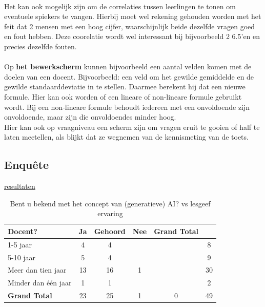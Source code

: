 \documentclass[12pt]{article}
\begin{document}
\begin{multicols}{2}
\\
Het kan ook mogelijk zijn om de correlaties tussen leerlingen te tonen om eventuele spiekers te vangen. Hierbij moet wel rekening gehouden worden met het feit dat 2 mensen met een hoog cijfer, waarschijnlijk beide dezelfde vragen goed en fout hebben. Deze coorelatie wordt wel interessant bij bijvoorbeeld 2 6.5'en en precies dezelfde fouten.\\
\\
Op \textbf{het bewerkscherm} kunnen bijvoorbeeld een aantal velden komen met de doelen van een docent. Bijvoorbeeld: een veld om het gewilde gemiddelde en de gewilde standaarddeviatie in te stellen. Daarmee berekent hij dat een nieuwe formule. Hier kan ook worden of een lineare of non-lineare formule gebruikt wordt. Bij een non-lineare formule behoudt iedereen met een onvoldoende zijn onvoldoende, maar zijn die onvoldoendes minder hoog. \\
Hier kan ook op vraagniveau een scherm zijn om vragen eruit te gooien of half te laten meetellen, als blijkt dat ze wegnemen van de kennismeting van de toets.
\end{multicols}

\pagebreak
\subsection{Enquête}
\href{https://docs.google.com/spreadsheets/d/10Z6uwL6eRiDsPIC6HQ5hyizUN8RciJKFSDRZBGiKdDI}{resultaten}

\noindent
\begin{table}[H]
    \caption{Bent u bekend met het concept van (generatieve) AI? vs lesgeef ervaring}
    \begin{tabular}{l c c c c c}
        \toprule
        \textbf{Docent?} & \textbf{Ja} & \textbf{Gehoord} & \textbf{Nee} & \textbf{Grand Total} \\
        \midrule
        1-5 jaar      & 4  & 4  &   &   & 8  \\
        5-10 jaar     & 5  & 4  &   &   & 9  \\
        Meer dan tien jaar & 13 & 16 & 1 &   & 30 \\
        Minder dan één jaar & 1  & 1  &   &   & 2  \\
        \midrule
        \textbf{Grand Total} & 23 & 25 & 1 & 0 & 49 \\
        \bottomrule
    \end{tabular}
\end{table}
\end{document}
